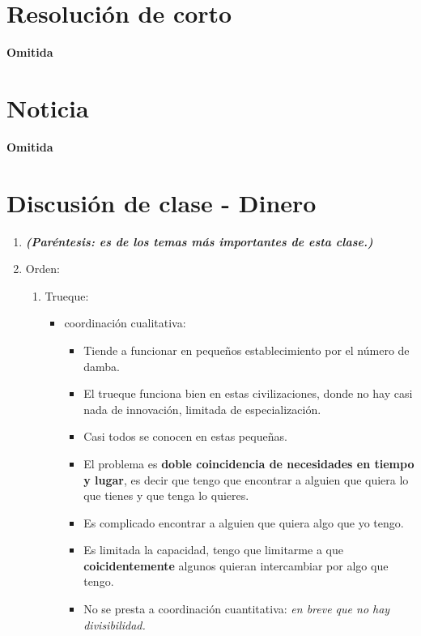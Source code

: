 \section{Resolución de corto}
\textbf{Omitida}
\section{Noticia}
\textbf{Omitida}

\section{Discusión de clase - Dinero}
\begin{enumerate}
    \item \emph{\textbf{(Paréntesis: es de los temas más importantes de esta clase.}\textbf{)}}
    
    \item Orden:
    \begin{enumerate}
        \item Trueque: 
            \begin{itemize}
                \item coordinación cualitativa:
                    \begin{itemize}
                        \item Tiende a funcionar en pequeños establecimiento por el número de damba.
                        \item El trueque funciona bien en estas civilizaciones, donde no hay casi nada de innovación, limitada de especialización.
                        \item Casi todos se conocen en estas pequeñas.
                        \item El problema es \textbf{doble coincidencia de necesidades en tiempo y lugar}, es decir que tengo que encontrar a alguien que quiera lo que tienes y que tenga lo quieres. 
                        \item Es complicado encontrar a alguien que quiera algo que yo tengo.
                        \item Es limitada la capacidad, tengo que limitarme a que \textbf{coicidentemente} algunos quieran intercambiar por algo que tengo.
                        \item No se presta a coordinación cuantitativa: \emph{en breve que no hay divisibilidad.}
                    \end{itemize}
            

\end{itemize}
\end{enumerate}
\end{enumerate}
